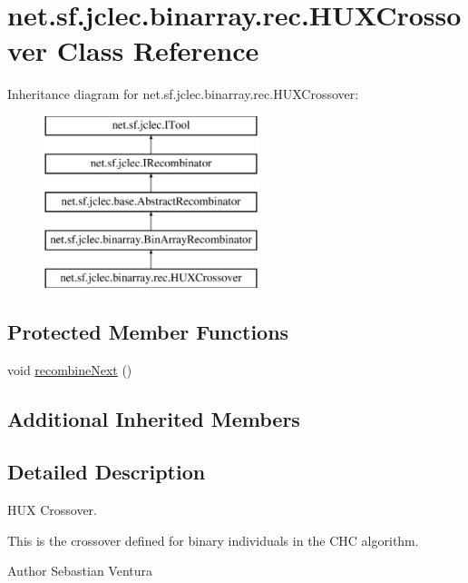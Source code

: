 \hypertarget{classnet_1_1sf_1_1jclec_1_1binarray_1_1rec_1_1_h_u_x_crossover}{\section{net.\-sf.\-jclec.\-binarray.\-rec.\-H\-U\-X\-Crossover Class Reference}
\label{classnet_1_1sf_1_1jclec_1_1binarray_1_1rec_1_1_h_u_x_crossover}
}
Inheritance diagram for net.\-sf.\-jclec.\-binarray.\-rec.\-H\-U\-X\-Crossover\-:\begin{figure}[H]
\begin{center}
\leavevmode
\includegraphics[height=5.000000cm]{classnet_1_1sf_1_1jclec_1_1binarray_1_1rec_1_1_h_u_x_crossover}
\end{center}
\end{figure}
\subsection*{Protected Member Functions}
\begin{DoxyCompactItemize}
\item 
void \hyperlink{classnet_1_1sf_1_1jclec_1_1binarray_1_1rec_1_1_h_u_x_crossover_af08ed17b50df7176acdddd4961f73ff6}{recombine\-Next} ()
\end{DoxyCompactItemize}
\subsection*{Additional Inherited Members}


\subsection{Detailed Description}
H\-U\-X Crossover.

This is the crossover defined for binary individuals in the C\-H\-C algorithm.

\begin{DoxyAuthor}{Author}
Sebastian Ventura 
\end{DoxyAuthor}


